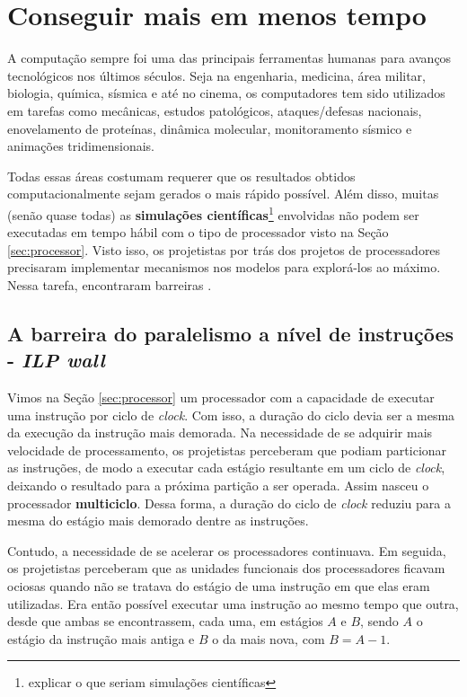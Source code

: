 \section{Conseguir mais em menos tempo}

	A computação sempre foi uma das principais ferramentas humanas para avanços 
	tecnológicos nos últimos séculos. Seja na engenharia, medicina, área 
	militar, biologia, química, sísmica e até no cinema, os computadores tem 
	sido utilizados em tarefas como mecânicas, estudos patológicos, 
	ataques/defesas nacionais, enovelamento de proteínas, dinâmica molecular, 
	monitoramento sísmico e animações tridimensionais.
	
	Todas essas áreas costumam requerer que os resultados obtidos 
	computacionalmente sejam gerados o mais rápido possível. Além disso, 
	muitas (senão quase todas) as \textbf{simulações científicas}\footnote{
		explicar o que seriam simulações científicas}
	envolvidas não podem ser executadas em tempo hábil com o tipo de processador
	visto na Seção \ref{sec:processor}. Visto 
	isso, os projetistas por trás dos projetos de processadores precisaram 
	implementar mecanismos nos modelos para explorá-los ao máximo. Nessa tarefa, 
	encontraram barreiras \cite{autor:intro-par-comp}.
    
    \subsection{A barreira do paralelismo a nível de instruções - \textit{ILP wall}}
    
    	Vimos na Seção \ref{sec:processor} um processador com a capacidade de 
    	executar uma instrução por ciclo de \textit{clock}. Com isso, a duração 
    	do ciclo devia ser a mesma da execução da instrução mais demorada. 
    	Na necessidade de se adquirir mais velocidade de processamento, 
    	os projetistas perceberam que podiam particionar as instruções, de modo 
    	a executar cada estágio resultante em um ciclo de \textit{clock}, 
    	deixando o resultado para a próxima partição a ser operada. Assim 
    	nasceu o processador \textbf{multiciclo}. Dessa forma, a duração 
    	do ciclo de \textit{clock} reduziu para a mesma do estágio mais 
    	demorado dentre as instruções.
    	
    	Contudo, a necessidade de se acelerar os processadores continuava. Em
    	seguida, os projetistas perceberam que as unidades funcionais dos 
    	processadores ficavam ociosas quando não se tratava do estágio de uma 
    	instrução em que elas eram utilizadas. Era então possível executar uma
    	instrução ao mesmo tempo que outra, desde que ambas se encontrassem, 
    	cada uma, em estágios $A$ e $B$, sendo $A$ o estágio da instrução mais 
    	antiga e $B$ o da mais nova,  com $B = A - 1$. 
    	
